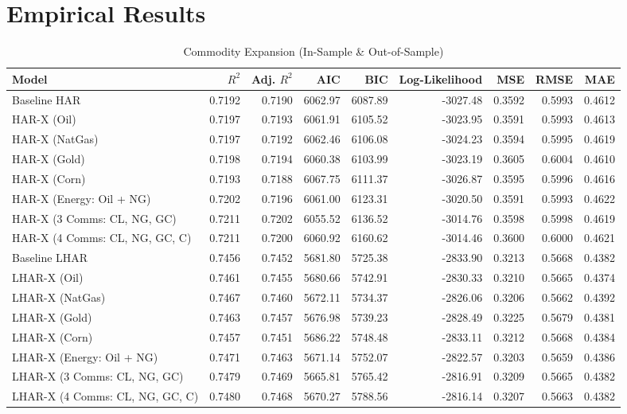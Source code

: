 \documentclass{report}
\begin{document}
\chapter{Empirical Results}

\begin{table}[htbp]
  \centering
  \caption{Commodity Expansion (In-Sample \& Out-of-Sample)}
  \label{tab:commodity_expansion}
  \begin{adjustbox}{max width=\textwidth}
  \begin{tabular}{lrrrrrrrr}
    \toprule
    Model & $R^2$ & Adj. $R^2$ & AIC & BIC & Log-Likelihood & MSE & RMSE & MAE \\
    \midrule
    Baseline HAR & 0.7192 & 0.7190 & 6062.97 & 6087.89 & -3027.48 & 0.3592 & 0.5993 & 0.4612 \\
    HAR-X (Oil) & 0.7197 & 0.7193 & 6061.91 & 6105.52 & -3023.95 & 0.3591 & 0.5993 & 0.4613 \\
    HAR-X (NatGas) & 0.7197 & 0.7192 & 6062.46 & 6106.08 & -3024.23 & 0.3594 & 0.5995 & 0.4619 \\
    HAR-X (Gold) & 0.7198 & 0.7194 & 6060.38 & 6103.99 & -3023.19 & 0.3605 & 0.6004 & 0.4610 \\
    HAR-X (Corn) & 0.7193 & 0.7188 & 6067.75 & 6111.37 & -3026.87 & 0.3595 & 0.5996 & 0.4616 \\
    HAR-X (Energy: Oil + NG) & 0.7202 & 0.7196 & 6061.00 & 6123.31 & -3020.50 & 0.3591 & 0.5993 & 0.4622 \\
    HAR-X (3 Comms: CL, NG, GC) & 0.7211 & 0.7202 & 6055.52 & 6136.52 & -3014.76 & 0.3598 & 0.5998 & 0.4619 \\
    HAR-X (4 Comms: CL, NG, GC, C) & 0.7211 & 0.7200 & 6060.92 & 6160.62 & -3014.46 & 0.3600 & 0.6000 & 0.4621 \\
    \midrule
    Baseline LHAR & 0.7456 & 0.7452 & 5681.80 & 5725.38 & -2833.90 & 0.3213 & 0.5668 & 0.4382 \\
    LHAR-X (Oil) & 0.7461 & 0.7455 & 5680.66 & 5742.91 & -2830.33 & 0.3210 & 0.5665 & 0.4374 \\
    LHAR-X (NatGas) & 0.7467 & 0.7460 & 5672.11 & 5734.37 & -2826.06 & 0.3206 & 0.5662 & 0.4392 \\
    LHAR-X (Gold) & 0.7463 & 0.7457 & 5676.98 & 5739.23 & -2828.49 & 0.3225 & 0.5679 & 0.4381 \\
    LHAR-X (Corn) & 0.7457 & 0.7451 & 5686.22 & 5748.48 & -2833.11 & 0.3212 & 0.5668 & 0.4384 \\
    LHAR-X (Energy: Oil + NG) & 0.7471 & 0.7463 & 5671.14 & 5752.07 & -2822.57 & 0.3203 & 0.5659 & 0.4386 \\
    LHAR-X (3 Comms: CL, NG, GC) & 0.7479 & 0.7469 & 5665.81 & 5765.42 & -2816.91 & 0.3209 & 0.5665 & 0.4382 \\
    LHAR-X (4 Comms: CL, NG, GC, C) & 0.7480 & 0.7468 & 5670.27 & 5788.56 & -2816.14 & 0.3207 & 0.5663 & 0.4382 \\
    \bottomrule
  \end{tabular}
  \end{adjustbox}
\end{table}
\end{document}
